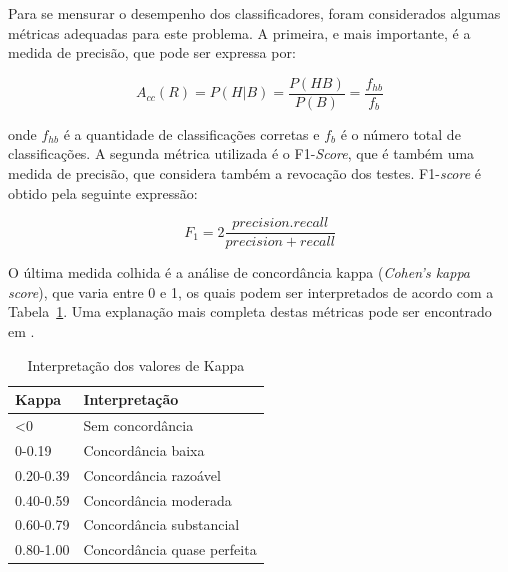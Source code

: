 Para se mensurar o desempenho dos classificadores, foram considerados algumas métricas adequadas para este problema. A primeira, e mais importante, é a medida de precisão, que pode ser expressa por:

\begin{equation}
A_{cc}(R) = P(H|B) = \frac{P(HB)}{P(B)} = \frac{f_{hb}}{f_b}
\end{equation}

\noindent onde $f_{hb}$ é a quantidade de classificações corretas e $f_{b}$ é o número total de classificações. A segunda métrica utilizada é o F1-\textit{Score}, que é também uma medida de precisão, que considera também a revocação dos testes. F1-\textit{score} é obtido pela seguinte expressão:

\begin{equation}
F_1 = 2\frac{precision.recall}{precision+recall}
\end{equation}

O última medida colhida é a análise de concordância kappa (\textit{Cohen's kappa score}), que varia entre 0 e 1, os quais podem ser interpretados de acordo com a Tabela~\ref{tab:kappa}. Uma explanação mais completa destas métricas pode ser encontrado em \cite{banerjee1999beyond}.

\begin{table}[H]
	\centering
	\caption{Interpretação dos valores de Kappa}
	\label{tab:kappa}
	\begin{tabular}{ll}
		\hline
		Kappa & Interpretação \\ \hline
		\textless0 & Sem concordância \\
		0-0.19 & Concordância baixa \\
		0.20-0.39 & Concordância razoável \\
		0.40-0.59 & Concordância moderada \\
		0.60-0.79 & Concordância substancial \\
		0.80-1.00 & Concordância quase perfeita \\ \hline
	\end{tabular}
\end{table}






